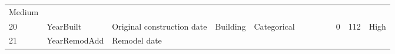 \documentclass[11pt]{article}
\begin{document}
\begin{longtable}[]{@{}llllllllllll@{}}
\begin{minipage}[t]{0.04\columnwidth}
Medium\strut
\end{minipage}\tabularnewline
\begin{minipage}[t]{0.04\columnwidth}\raggedright\strut
20\strut
\end{minipage} & \begin{minipage}[t]{0.04\columnwidth}\raggedright\strut
YearBuilt\strut
\end{minipage} & \begin{minipage}[t]{0.04\columnwidth}\raggedright\strut
Original construction date\strut
\end{minipage} & \begin{minipage}[t]{0.04\columnwidth}\raggedright\strut
Building\strut
\end{minipage} & \begin{minipage}[t]{0.04\columnwidth}\raggedright\strut
Categorical\strut
\end{minipage} & \begin{minipage}[t]{0.04\columnwidth}\raggedright\strut
\strut
\end{minipage} & \begin{minipage}[t]{0.04\columnwidth}\raggedright\strut
\strut
\end{minipage} & \begin{minipage}[t]{0.04\columnwidth}\raggedright\strut
\strut
\end{minipage} & \begin{minipage}[t]{0.04\columnwidth}\raggedright\strut
\strut
\end{minipage} & \begin{minipage}[t]{0.04\columnwidth}\raggedright\strut
0\strut
\end{minipage} & \begin{minipage}[t]{0.04\columnwidth}\raggedright\strut
112\strut
\end{minipage} & \begin{minipage}[t]{0.04\columnwidth}\raggedright\strut
High\strut
\end{minipage}\tabularnewline
\begin{minipage}[t]{0.04\columnwidth}\raggedright\strut
21\strut
\end{minipage} & \begin{minipage}[t]{0.04\columnwidth}\raggedright\strut
YearRemodAdd\strut
\end{minipage} & \begin{minipage}[t]{0.04\columnwidth}\raggedright\strut
Remodel date\strut
\end{minipage} & \begin{minipage}[t]{0.04\columnwidth}\raggedright\strut

\end{minipage}
\end{longtable}
\end{document}
